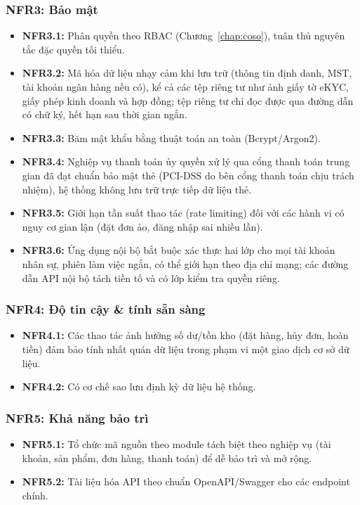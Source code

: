 \subsubsection*{NFR3: Bảo mật}
\begin{itemize}
    \item \textbf{NFR3.1:} Phân quyền theo RBAC (Chương~\ref{chap:coso}), tuân
    thủ nguyên tắc đặc quyền tối thiểu.
    \item \textbf{NFR3.2:} Mã hóa dữ liệu nhạy cảm khi lưu trữ (thông tin
    định danh, MST, tài khoản ngân hàng nếu có), kể cả các tệp riêng tư như
    ảnh giấy tờ eKYC, giấy phép kinh doanh và hợp đồng; tệp riêng tư chỉ đọc
    được qua đường dẫn có chữ ký, hết hạn sau thời gian ngắn.
    \item \textbf{NFR3.3:} Băm mật khẩu bằng thuật toán an toàn
    (Bcrypt/Argon2).
    \item \textbf{NFR3.4:} Nghiệp vụ thanh toán ủy quyền xử lý qua cổng
    thanh toán trung gian đã đạt chuẩn bảo mật thẻ (PCI-DSS do bên cổng
    thanh toán chịu trách nhiệm), hệ thống không lưu trữ trực tiếp dữ liệu
    thẻ.
    \item \textbf{NFR3.5:} Giới hạn tần suất thao tác (rate limiting) đối
    với các hành vi có nguy cơ gian lận (đặt đơn ảo, đăng nhập sai nhiều
    lần).
    \item \textbf{NFR3.6:} Ứng dụng nội bộ bắt buộc xác thực hai lớp cho mọi
    tài khoản nhân sự, phiên làm việc ngắn, có thể giới hạn theo địa chỉ mạng;
    các đường dẫn API nội bộ tách tiền tố và có lớp kiểm tra quyền riêng.
\end{itemize}

\subsubsection*{NFR4: Độ tin cậy \& tính sẵn sàng}
\begin{itemize}
    \item \textbf{NFR4.1:} Các thao tác ảnh hưởng số dư/tồn kho (đặt hàng,
    hủy đơn, hoàn tiền) đảm bảo tính nhất quán dữ liệu trong phạm vi một
    giao dịch cơ sở dữ liệu.
    \item \textbf{NFR4.2:} Có cơ chế sao lưu định kỳ dữ liệu hệ thống.
\end{itemize}

\subsubsection*{NFR5: Khả năng bảo trì}
\begin{itemize}
    \item \textbf{NFR5.1:} Tổ chức mã nguồn theo module tách biệt theo
    nghiệp vụ (tài khoản, sản phẩm, đơn hàng, thanh toán) để dễ bảo trì và
    mở rộng.
    \item \textbf{NFR5.2:} Tài liệu hóa API theo chuẩn OpenAPI/Swagger cho
    các endpoint chính.
\end{itemize}

